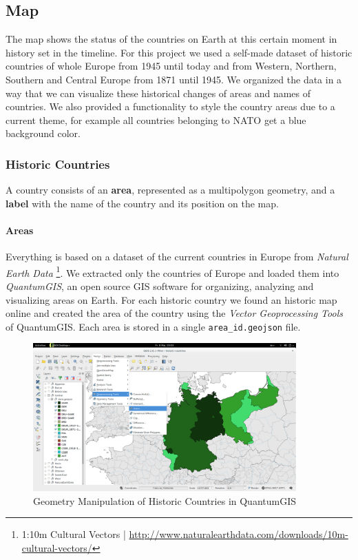 \subsection{Map} %
\label{sub:map}

The map shows the status of the countries on Earth at this certain moment in history set in the timeline. For this project we used a self-made dataset of historic countries of whole Europe from 1945 until today and from Western, Northern, Southern and Central Europe from 1871 until 1945. We organized the data in a way that we can visualize these historical changes of areas and names of countries. We also provided a functionality to style the country areas due to a current theme, for example all countries belonging to NATO get a blue background color.

\subsubsection{Historic Countries} %
\label{ssub:historic_countries}

A country consists of an \textbf{area}, represented as a multipolygon geometry, and a \textbf{label} with the name of the country and its position on the map.

\newpage
\paragraph{Areas}
Everything is based on a dataset of the current countries in Europe from \textit{Natural Earth Data}
\footnote{1:10m Cultural Vectors | \url{http://www.naturalearthdata.com/downloads/10m-cultural-vectors/}}.
We extracted only the countries of Europe and loaded them into \textit{QuantumGIS}, an open source GIS software for organizing, analyzing and visualizing areas on Earth. For each historic country we found an historic map online and created the area of the country using the \textit{Vector Geoprocessing Tools} of QuantumGIS. Each area is stored in a single \texttt{area\_id.geojson} file.

\begin{figure}[H]
  \begin{center}
    \includegraphics[width=0.9\textwidth]{graphics/qgis.png}
  \end{center}
  \caption{Geometry Manipulation of Historic Countries in QuantumGIS}
  \label{fig:qgis}
\end{figure}
\label{par:area}

